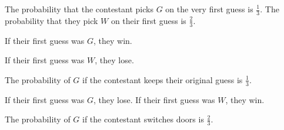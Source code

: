 \documentclass[12pt]{article}
\begin{document}
\medskip
{}


    The probability that the contestant picks $G$ on the very first guess is $\frac 1 3$. The probability that they pick $W$ on their first guess is $\frac 2 3$.
    
\medskip
{}

    If their first guess was $G$, they win.
    
    If their first guess was $W$, they lose.
    
\medskip
{}

    The probability of $G$ if the contestant keeps their original guess is $\frac 1 3$.
    
\medskip
{}

    If their first guess was $G$, they lose. If their first guess was $W$, they win.
    
\medskip
{}

    The probability of $G$ if the contestant switches doors is $\frac 2 3$.
\end{document}
